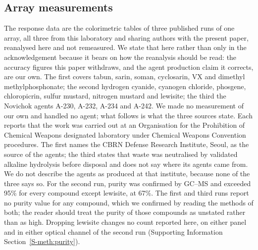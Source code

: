 \documentclass[journal=jacsat,manuscript=article,margin=1in]{achemso}
\begin{document}
\subsection{Array measurements}
\label{meth:array}
The response data are the colorimetric tables of three published runs of one
array, all three from this laboratory and sharing authors with the present
paper, reanalysed here and not remeasured. We state that here rather than
only in the acknowledgement because it bears on how the reanalysis should be
read: the accuracy figures this paper withdraws, and the agent production
claim it corrects, are our own. The first covers tabun, sarin,
soman, cyclosarin, VX and dimethyl methylphosphonate\cite{hazref}; the second
hydrogen cyanide, cyanogen chloride, phosgene, chloropicrin, sulfur mustard,
nitrogen mustard and lewisite\cite{multiplexref}; the third the Novichok
agents A-230, A-232, A-234 and A-242\cite{group3ref}. We made no
measurement of our own and handled no agent; what follows is what the three
sources state. Each reports that the work was carried out at an
Organisation for the Prohibition of Chemical Weapons designated laboratory
under Chemical Weapons Convention procedures. The first names the CBRN
Defense Research Institute, Seoul, as the source of the
agents\cite{hazref}; the third states that waste was neutralised by
validated alkaline hydrolysis before disposal and does not say where its
agents came from\cite{group3ref}. We do not describe the agents as produced
at that institute, because none of the three says so. For the second run,
purity was confirmed by GC--MS and exceeded 95\% for every compound except
lewisite, at 67\%.\cite{multiplexref} The first and third runs report no
purity value for any compound, which we confirmed by reading the methods of
both; the reader should treat the purity of those compounds as unstated
rather than as high.
Dropping lewisite changes no count reported here, on either panel and in
either optical channel of the second run (Supporting Information
Section~\ref{S-meth:purity}).
\end{document}
